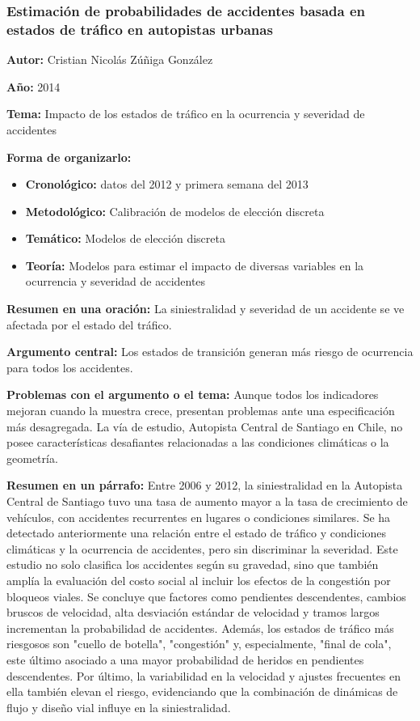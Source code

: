 \documentclass{book}
\begin{document}
\subsubsection{Estimación de probabilidades de accidentes basada en estados de tráfico en autopistas urbanas}
\textbf{Autor:} Cristian Nicolás Zúñiga González

\textbf{Año:} 2014

\textbf{Tema:} Impacto de los estados de tráfico en la ocurrencia y severidad de accidentes

\textbf{Forma de organizarlo:}

\begin{itemize}
\setlength{\itemindent}{0.5in}
    \item \textbf{Cronológico:} datos del 2012 y primera semana del 2013
    \item \textbf{Metodológico:} Calibración de modelos de elección discreta
    \item \textbf{Temático:} Modelos de elección discreta
    \item \textbf{Teoría:} Modelos para estimar el impacto de diversas variables en la ocurrencia y severidad de accidentes
\end{itemize}

\textbf{Resumen en una oración:} La siniestralidad y severidad de un accidente se ve afectada por el estado del tráfico.

\textbf{Argumento central:} Los estados de transición generan más riesgo de ocurrencia para todos los accidentes.

\textbf{Problemas con el argumento o el tema:} Aunque todos los indicadores mejoran cuando la muestra crece, presentan problemas ante una especificación más desagregada. La vía de estudio, Autopista Central de Santiago en Chile, no posee características desafiantes relacionadas a las condiciones climáticas o la geometría.

\textbf{Resumen en un párrafo:} Entre 2006 y 2012, la siniestralidad en la Autopista Central de Santiago tuvo una  tasa de aumento mayor a la tasa de crecimiento de vehículos, con accidentes recurrentes en lugares o condiciones similares. Se ha detectado anteriormente una relación entre el estado de tráfico y condiciones climáticas y la ocurrencia de accidentes, pero sin discriminar la severidad. Este estudio no solo clasifica los accidentes según su gravedad, sino que también amplía la evaluación del costo social al incluir los efectos de la congestión por bloqueos viales. Se concluye que factores como pendientes descendentes, cambios bruscos de velocidad, alta desviación estándar de velocidad y tramos largos incrementan la probabilidad de accidentes. Además, los estados de tráfico más riesgosos son "cuello de botella", "congestión" y, especialmente, "final de cola", este último asociado a una mayor probabilidad de heridos en pendientes descendentes. Por último, la variabilidad en la velocidad y ajustes frecuentes en ella también elevan el riesgo, evidenciando que la combinación de dinámicas de flujo y diseño vial influye en la siniestralidad.
\end{document}
